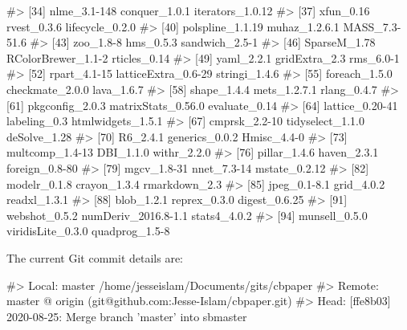 \documentclass[
]{jss}
\begin{document}
\begin{CodeChunk}
\begin{CodeOutput}
#> [34] nlme_3.1-148        conquer_1.0.1       iterators_1.0.12   
#> [37] xfun_0.16           rvest_0.3.6         lifecycle_0.2.0    
#> [40] polspline_1.1.19    muhaz_1.2.6.1       MASS_7.3-51.6      
#> [43] zoo_1.8-8           hms_0.5.3           sandwich_2.5-1     
#> [46] SparseM_1.78        RColorBrewer_1.1-2  rticles_0.14       
#> [49] yaml_2.2.1          gridExtra_2.3       rms_6.0-1          
#> [52] rpart_4.1-15        latticeExtra_0.6-29 stringi_1.4.6      
#> [55] foreach_1.5.0       checkmate_2.0.0     lava_1.6.7         
#> [58] shape_1.4.4         mets_1.2.7.1        rlang_0.4.7        
#> [61] pkgconfig_2.0.3     matrixStats_0.56.0  evaluate_0.14      
#> [64] lattice_0.20-41     labeling_0.3        htmlwidgets_1.5.1  
#> [67] cmprsk_2.2-10       tidyselect_1.1.0    deSolve_1.28       
#> [70] R6_2.4.1            generics_0.0.2      Hmisc_4.4-0        
#> [73] multcomp_1.4-13     DBI_1.1.0           withr_2.2.0        
#> [76] pillar_1.4.6        haven_2.3.1         foreign_0.8-80     
#> [79] mgcv_1.8-31         nnet_7.3-14         mstate_0.2.12      
#> [82] modelr_0.1.8        crayon_1.3.4        rmarkdown_2.3      
#> [85] jpeg_0.1-8.1        grid_4.0.2          readxl_1.3.1       
#> [88] blob_1.2.1          reprex_0.3.0        digest_0.6.25      
#> [91] webshot_0.5.2       numDeriv_2016.8-1.1 stats4_4.0.2       
#> [94] munsell_0.5.0       viridisLite_0.3.0   quadprog_1.5-8
\end{CodeOutput}
\end{CodeChunk}

The current Git commit details are:

\begin{CodeChunk}

\begin{CodeOutput}
#> Local:    master /home/jesseislam/Documents/gits/cbpaper
#> Remote:   master @ origin (git@github.com:Jesse-Islam/cbpaper.git)
#> Head:     [ffe8b03] 2020-08-25: Merge branch 'master' into sbmaster
\end{CodeOutput}
\end{CodeChunk}


\end{document}
